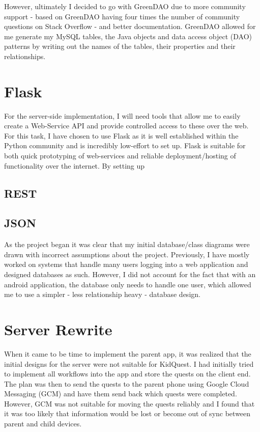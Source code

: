 However, ultimately I decided to go with GreenDAO due to more community support - based on GreenDAO having four times the number of community questions on Stack Overflow - and better documentation.
GreenDAO allowed for me generate my MySQL tables, the Java objects and data access object (DAO) patterns by writing out the names of the tables, their properties and their relationships. 

\section{Flask}
For the server-side implementation, I will need tools that allow me to easily create a Web-Service API and provide controlled access to these over the web.
For this task, I have chosen to use Flask as it is well established within the Python community and is incredibly low-effort to set up. 
Flask is suitable for both quick prototyping of web-services and reliable deployment/hosting of functionality over the internet.
By setting up 

\subsection{REST}

\subsection{JSON}



As the project began it was clear that my initial database/class diagrams were drawn with incorrect assumptions about the project. 
Previously, I have mostly worked on systems that handle many users logging into a web application and designed databases as such. 
However, I did not account for the fact that with an android application, the database only needs to handle one user, which allowed me to use a simpler - less relationship heavy - database design.

\section{Server Rewrite}
When it came to be time to implement the parent app, it was realized that the initial designs for the server were not suitable for KidQuest.
I had initially tried to implement all workflows into the app and store the quests on the client end. 
The plan was then to send the quests to the parent phone using Google Cloud Messaging (GCM) and have them send back which quests were completed.
However, GCM was not suitable for moving the quests reliably and I found that it was too likely that information would be lost or become out of sync between parent and child devices.

